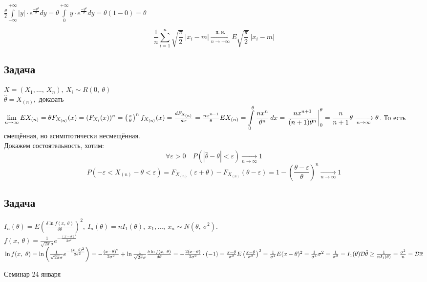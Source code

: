 \documentclass[12pt, a4paper]{article}
\newcommand{\dev}{\mathcal{D}}
\begin{document}
$\displaystyle\frac{\theta}{2}\int \limits_{-\infty}^{+\infty}|y|\cdot e^{\frac{-y^2}{2}} dy  = \theta \int \limits_{0}^{+\infty} y\cdot e^{\frac{-y^2}{2}} dy = \theta (1-0) = \theta$

\[\frac{1}{n}\sum \limits_{i=1}^{n} \sqrt{\frac{\pi}{2}} \ |x_i-m| \xrightarrow[n\to+\infty]{\text{п.\ н.}}  E\sqrt{\frac{\pi}{2}} \ |x_i-m|\]

\subsection*{Задача}
$X = (X_1,\dots,\ X_n),\ X_i\sim R(0,\ \theta)$\\
$\hat{\theta} = X_{(n)},$ доказать $ \lim\limits_{n\to\infty} EX_{(n)} = \theta\\
    F_{X_{(n)}} (x) = (F_{X_i}(x))^n = \left(\frac{x}{\theta}\right)^n\\
    f_{X_{(n)}} (x) = \frac{d F_{X_{(n)}}}{dx} = \frac{nx^{n - 1}}{\theta}\\
    \displaystyle E X_{(n)} = \int \limits _0^{\theta} \frac{n x^n}{\theta^n}\, dx = \left.\frac{n x^{n + 1}}{(n + 1)\theta^n} \right|_0^{\theta} = \frac{n}{n + 1}\theta \xrightarrow[n\to\infty]{} \theta$. То есть смещённая, но асимптотически несмещённая.\\
Докажем состоятельность, хотим:
\[\forall \varepsilon > 0\quad P(|\hat{\theta} - \theta| < \varepsilon) \xrightarrow[n\to\infty]{} 1\]
\[P(-\varepsilon < X_{(n)} - \theta < \varepsilon) = F_{X_(n)} (\varepsilon + \theta) - F_{X_{(n)}}(\theta - \varepsilon) = 1 - \left( \frac{\theta - \varepsilon}{\theta} \right)^n \xrightarrow[n\to\infty]{} 1\]
\subsection*{Задача}
$I_n(\theta) = E\left( \frac{\delta \ln f(x,\ \theta)}{\delta \theta} \right)^2,\ I_n(\theta) = nI_1(\theta),\ x_1,\dots,\ x_n\sim N(\theta,\ \sigma^2)$.\\
$f(x,\ \theta) = \frac{1}{\sqrt{2\pi}\sigma} e^{-\frac{(x - \theta)^2}{2\sigma^2}}$\\
$\ln f(x,\ \theta) = \ln \left( \frac{1}{\sqrt{2\pi}\sigma }e^{-\frac{(x - \theta)^2}{2\sigma^2}} \right) = -\frac{(x - \theta)^2}{2\sigma^2} + \ln \frac{1}{\sqrt{2\pi}\sigma}\\
    \frac{\delta\ln f(x,\ \theta)}{\delta\theta} = -\frac{2(x - \theta)}{2\sigma^2}\cdot (-1) = \frac{x - \theta}{\sigma^2}\\
    E\left( \frac{x - \theta}{\sigma^2} \right)^2 = \frac{1}{\sigma^4} E(x - \theta)^2 = \frac{1}{\sigma^4} \sigma^2 = \frac{1}{\sigma^2} = I_1(\theta)\\
    \dev \hat{\theta} \geq \frac{1}{nI_1(\theta)} = \frac{\sigma^2}{n} =\mathcal{D}\overline{x}$
\begin{center}
    Семинар 24 января
\end{center}
\end{document}
